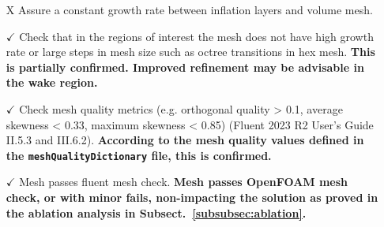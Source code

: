 \documentclass[12pt]{article}
\begin{document}
\begin{itemize}
    \item[X] Assure a constant growth rate between inflation layers and volume mesh.
    \item[$\checkmark$] Check that in the regions of interest the mesh does not have high growth rate or large steps in mesh size such as octree transitions in hex mesh. \textbf{This is partially confirmed. Improved refinement may be advisable in the wake region.}
    \item[$\checkmark$] Check mesh quality metrics (e.g. orthogonal quality > 0.1, average skewness < 0.33, maximum skewness < 0.85) (Fluent 2023 R2 User's Guide II.5.3 and III.6.2).
    \textbf{According to the mesh quality values defined in the \texttt{meshQualityDictionary} file, this is confirmed.}
    \item[$\checkmark$] Mesh passes fluent mesh check. \textbf{Mesh passes OpenFOAM mesh check, or with minor fails, non-impacting the solution as proved in the ablation analysis in Subsect.~\ref{subsubsec:ablation}.} 
\end{itemize}
\end{document}
